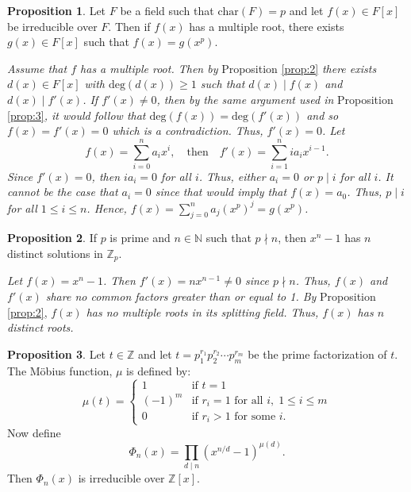 \documentclass{article}
\makeatletter
\theoremstyle{definition}
\newtheorem{prop}{Proposition}
\theoremstyle{remark}
\let\oldproofname=\proofname
\renewcommand{\proofname}{\bf{\textit{\oldproofname}}}
\theoremstyle{definition}
\renewenvironment{proof}[1][\proofname]{\par
  \pushQED{\qed}%
  \normalfont \topsep6\p@\@plus6\p@\relax
  \list{}{\leftmargin=0mm
          \rightmargin=0mm
          \settowidth{\itemindent}{\itshape#1}%
          \labelwidth=4mm
          \parsep=0pt \listparindent=0mm%
  }
  \item[\hskip\labelsep
        \itshape
    #1\@addpunct{.}]\ignorespaces
}{%
  \popQED\endlist\@endpefalse
}
\makeatother
\begin{document}
    \begin{prop}\label{prop:5}
        Let $F$ be a field such that $\text{char}(F)=p$ and let $f(x)\in F[x]$ be irreducible over $F$. Then if $f(x)$ has a multiple root, there exists $g(x)\in F[x]$ such that $f(x)=g(x^p)$. 
    \end{prop}
        \begin{proof}
            \emph{Assume that $f$ has a multiple root. Then by }Proposition \ref{prop:2}\emph{ there exists $d(x)\in F[x]$ with $\text{deg}(d(x))\geq 1$ such that $d(x)\mid f(x)$ and $d(x)\mid f'(x)$. If $f'(x)\neq 0$, then by the same argument used in} Proposition \ref{prop:3}\emph{, it would follow that $\text{deg}(f(x))=\text{deg}(f'(x))$ and so $f(x)=f'(x)=0$ which is a contradiction. Thus, $f'(x)=0$. Let}
                \begin{equation*}
                    f(x)=\sum\limits_{i=0}^na_ix^i,\quad\text{then}\quad f'(x)=\sum\limits_{i=1}^n ia_ix^{i-1}.
                \end{equation*}
            \emph{Since $f'(x)=0$, then $ia_i=0$ for all $i$. Thus, either $a_i=0$ or $p\mid i$ for all $i$. It cannot be the case that $a_i=0$ since that would imply that $f(x)=a_0$. Thus, $p\mid i$ for all $1\leq i\leq n$. Hence, $f(x)=\sum_{j=0}^na_j(x^p)^j=g(x^p)$. }
        \end{proof}
    \begin{prop}\label{prop:6}
        If $p$ is prime and $n\in\mathbb{N}$ such that $p\nmid n$, then $x^n-1$ has $n$ distinct solutions in $\mathbb{Z}_p$.
    \end{prop}
        \begin{proof}
            \emph{Let $f(x)=x^n-1$. Then $f'(x)=nx^{n-1}\neq 0$ since $p\nmid n$. Thus, $f(x)$ and $f'(x)$ share no common factors greater than or equal to 1. By} Proposition \ref{prop:2},\emph{ $f(x)$ has no multiple roots  in its splitting field. Thus, $f(x)$ has $n$ distinct roots.}
        \end{proof}
    \begin{prop}\label{prop:7}
        Let $t\in\mathbb{Z}$ and let $t=p_1^{r_1}p_2^{r_2}\cdots p_m^{r_m}$ be the prime factorization of $t$. The M\"obius function, $\mu$ is defined by: 
            \begin{equation*}
                \mu(t)=\begin{cases} 
                    1 &\text{if } t=1 \\
                    (-1)^m &\text{if } r_i=1 \text{ for all } i,\; 1\leq i\leq m \\
                    0 &\text{if } r_i>1 \text{ for some } i.
                \end{cases}
            \end{equation*}
        Now define
            \begin{equation*}
                \Phi_n(x)=\prod_{d\mid n}(x^{n/d}-1)^{\mu(d)}.
            \end{equation*}
        Then $\Phi_n(x)$ is irreducible over $\mathbb{Z}[x]$.
    \end{prop}
\end{document}
